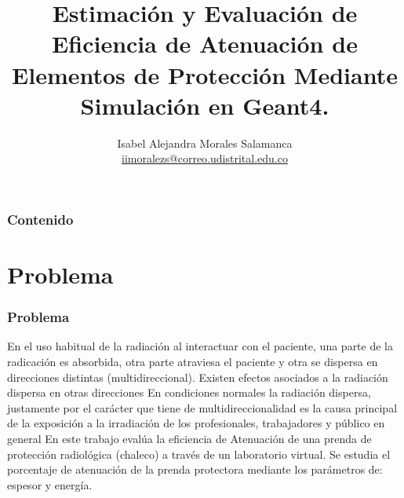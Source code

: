 \documentclass{beamer}
\title[Licenciatura en Física]{Estimación y Evaluación de Eficiencia de Atenuación de Elementos de Protección Mediante Simulación en Geant4.}
\author[Isabel Alejandra Morales S.]{
  Isabel Alejandra Morales Salamanca \\\medskip
  {\small \url{iimoralezs@correo.udistrital.edu.co}}
 \\}
\institute[Universidad Distrital]{
  Instituto de Ingeominas -- Licenciatura en Física \\
  Universidad Distrital Francisco José de Caldas}
\begin{document}
\begin{frame}
  \titlepage
\end{frame}

\begin{frame}
  \frametitle{Contenido}
  

  \tableofcontents
\end{frame}

\section{Problema}

\begin{frame}
  \frametitle{Problema}

En el uso habitual de la radiación al interactuar con el paciente, una  parte de la radicación es absorbida, otra parte atraviesa el paciente y otra se dispersa en direcciones distintas (multidireccional). Existen efectos asociados a la radiación dispersa en otras direcciones%
En condiciones normales%
la  radiación dispersa, justamente por el carácter que tiene de multidireccionalidad es la causa principal de la exposición a la  irradiación de los profesionales, trabajadores y público en general %
En este trabajo evalúa la eficiencia de Atenuación de una prenda de protección radiológica (chaleco) a través de un laboratorio virtual. Se estudia el porcentaje de atenuación de la prenda protectora mediante los parámetros de: espesor y energía.

\end{frame}
\end{document}
